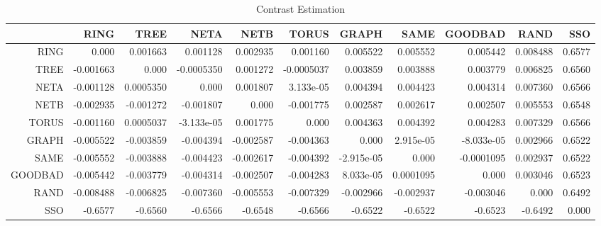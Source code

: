\documentclass[a4paper,10pt]{article}
\begin{document}
\begin{landscape}
\begin{table}[!htp]
\centering\tiny
\caption{Contrast Estimation}
\begin{tabular}{
|r|r|r|r|r|r|r|r|r|r|r|}
\hline
 & RING& TREE& NETA& NETB& TORUS& GRAPH& SAME& GOODBAD& RAND& SSO\\
\hline
 RING&0.000&0.001663&0.001128&0.002935&0.001160&0.005522&0.005552&0.005442&0.008488&0.6577\\
\hline
 TREE&-0.001663&0.000&-0.0005350&0.001272&-0.0005037&0.003859&0.003888&0.003779&0.006825&0.6560\\
\hline
 NETA&-0.001128&0.0005350&0.000&0.001807&3.133e-05&0.004394&0.004423&0.004314&0.007360&0.6566\\
\hline
 NETB&-0.002935&-0.001272&-0.001807&0.000&-0.001775&0.002587&0.002617&0.002507&0.005553&0.6548\\
\hline
 TORUS&-0.001160&0.0005037&-3.133e-05&0.001775&0.000&0.004363&0.004392&0.004283&0.007329&0.6566\\
\hline
 GRAPH&-0.005522&-0.003859&-0.004394&-0.002587&-0.004363&0.000&2.915e-05&-8.033e-05&0.002966&0.6522\\
\hline
 SAME&-0.005552&-0.003888&-0.004423&-0.002617&-0.004392&-2.915e-05&0.000&-0.0001095&0.002937&0.6522\\
\hline
 GOODBAD&-0.005442&-0.003779&-0.004314&-0.002507&-0.004283&8.033e-05&0.0001095&0.000&0.003046&0.6523\\
\hline
 RAND&-0.008488&-0.006825&-0.007360&-0.005553&-0.007329&-0.002966&-0.002937&-0.003046&0.000&0.6492\\
\hline
 SSO&-0.6577&-0.6560&-0.6566&-0.6548&-0.6566&-0.6522&-0.6522&-0.6523&-0.6492&0.000\\
\hline

\end{tabular}
\end{table}

\newpage


\end{landscape}
\end{document}
